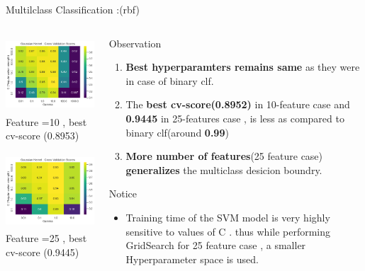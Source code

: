 \documentclass[12pt,t]{beamer}
\begin{document}
\begin{frame}[t]{Multilclass Classification :(rbf)}

    \scriptsize

    \begin{columns}
        \begin{column}[T]{0.5\linewidth}
            \includegraphics[width=\linewidth,height=80pt]{images/p1a/3(multiclass)/multilibsvm_rbf10f.png}
            \vspace{-2pt}
            \centering Feature =10 , best cv-score (0.8953)

            \includegraphics[width=\linewidth,height=80pt]{images/p1a/3(multiclass)/multilibsvm_rbf25f.png}
            \vspace{-2pt}
            \centering Feature =25 , best cv-score (0.9445)


        \end{column}
        \begin{column}[T]{0.5\linewidth}
            \begin{block}{Observation}
                \begin{enumerate}
                    \item \textbf{Best hyperparamters remains same} as they were in case of binary clf.
                    \item The \textbf{best cv-score(0.8952)} in 10-feature case and \textbf{0.9445} in 25-features case , is less as compared to binary clf(around \textbf{0.99})
                    \item \textbf{More number of features}(25 feature case) \textbf{generalizes} the multiclass desicion boundry.
                \end{enumerate}
            \end{block}


            \begin{block}{Notice}
                \begin{itemize}
                    \item Training time of the SVM model is very highly sensitive to values of C .
                         thus while performing 
                        GridSearch for 25 feature case , a smaller Hyperparameter space is used.
                \end{itemize}
            \end{block}
        \end{column}        
    \end{columns}


\end{frame}
\end{document}
